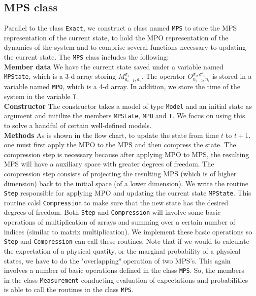 \documentclass[english]{article}
\begin{document}
\subsection{MPS class}
Parallel to the class \texttt{Exact}, we construct a class named \texttt{MPS} to store the MPS representation of the current state, to hold the MPO representation of the dynamics of the system and to comprise several functions necessary to updating the current state. The \texttt{MPS} class includes the following:
\\[3mm]
\noindent\textbf{Member data} We have the current state saved under a variable named \texttt{MPState}, which is a 3-d array storing $M^{\sigma_i}_{a_{i-1},a_i}$. The operator $O^{\sigma_i, \sigma'_i}_{n_{i-1}, n_i}$ is stored in a variable named \texttt{MPO}, which is a 4-d array. In addition, we store the time of the system in the variable \texttt{T}.
\\[3mm]
\noindent\textbf{Constructor} The constructor takes a model of type \texttt{Model} and an initial state as argument and initilize the members \texttt{MPState}, \texttt{MPO} and \texttt{T}. We  focus on using this to solve a handful of certain well-defined models.
\\[3mm]
\noindent\textbf{Methods} As is shown in the flow chart, to update the state from time $t$ to $t+1$, one must first apply the MPO to the MPS and then compress the state. The compression step is necessary because after applying MPO to MPS, the resulting MPS will have a  auxiliary space with greater degrees of freedom. The compression step consists of projecting the resulting MPS (which is of higher dimension) back to the initial space (of a lower dimension). We write the routine \texttt{Step} responsible for applying MPO and updating the current state \texttt{MPState}. This routine calsl \texttt{Compression} to make sure that the new state has the desired degrees of freedom.
Both \texttt{Step} and \texttt{Compression} will involve some basic operations of multiplication of arrays and summing over a certain number of indices (similar to matrix multiplication). We implement these basic operations so \texttt{Step} and \texttt{Compression} can call these routines.
Note that if we would to calculate the expectation of a physical quatity, or the marginal probability of a physical states, we have to do the "overlapping" operation of two MPS's. This again involves a number of basic operations defined in the class \texttt{MPS}. So, the members in the class \texttt{Measurement} conducting evaluation of expectations and probabilities is able to call the routines in the class \texttt{MPS}.
\end{document}
